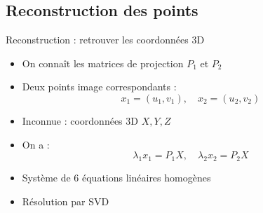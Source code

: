 \subsection{Reconstruction des points}
\begin{frame}{Reconstruction : retrouver les coordonnées 3D}
\begin{minipage}[t]{0.48\textwidth}
  \vspace*{\fill}
  \begin{itemize}
    \item<1-> On connaît les matrices de projection \( P_1 \) et \( P_2 \)
    \item<2-> Deux points image correspondants :
    \vspace*{-0.5em}
    \[
      x_1 = (u_1, v_1),\quad x_2 = (u_2, v_2)
    \]
    \item<3-> Inconnue : coordonnées 3D  \( X , Y, Z \)
    \item<4-> On a :
    \vspace*{-0.5em}
    \[
      \lambda_1 x_1 = P_1 X,\quad \lambda_2 x_2 = P_2 X
    \]
    \item<5-> Système de 6 équations linéaires homogènes
    \item<6-> Résolution par SVD
  \end{itemize}
  \vspace*{\fill}
\end{minipage}
\hfill
\begin{minipage}[t]{0.50\textwidth}
\end{minipage}
\end{frame}



